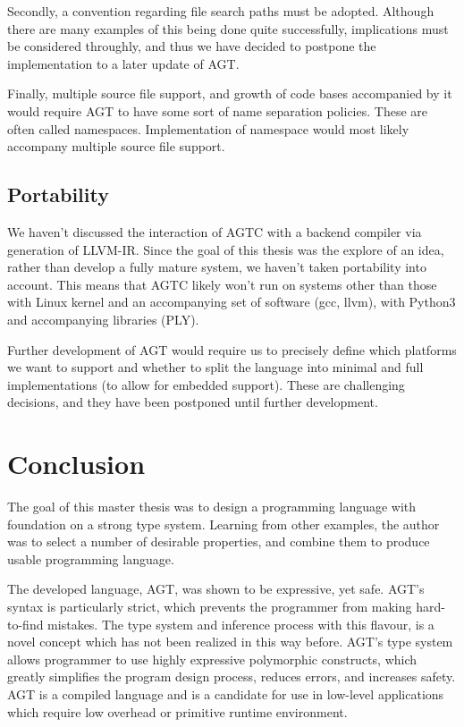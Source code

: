 \documentclass[times, utf8, diplomski]{fer}
\theoremstyle{definition}
\begin{document}
Secondly, a convention regarding file search paths must be adopted. Although there are many
examples of this being done quite successfully, implications must be considered throughly,
and thus we have decided to postpone the implementation to a later update of AGT.

Finally, multiple source file support, and growth of code bases accompanied by it would require
AGT to have some sort of name separation policies. These are often called namespaces.
Implementation of namespace would most likely accompany multiple source file support.

\section{Portability}

We haven't discussed the interaction of AGTC with a backend compiler via generation of LLVM-IR.
Since the goal of this thesis was the explore of an idea, rather than develop a fully mature system,
we haven't taken portability into account. This means that AGTC likely won't run on systems
other than those with Linux kernel and an accompanying set of software (gcc, llvm),
with Python3 and accompanying libraries (PLY).

Further development of AGT would require us to precisely define which platforms we want to support and
whether to split the language into minimal and full implementations (to allow for embedded support).
These are challenging decisions, and they have been postponed until further development.

\chapter{Conclusion}\label{chap:concl}

The goal of this master thesis was to design a programming language with foundation
on a strong type system. Learning from other examples, the author was to select a number
of desirable properties, and combine them to produce usable programming language.

The developed language, AGT, was shown to be expressive, yet safe. 
AGT's syntax is particularly strict, which prevents the programmer from making hard-to-find mistakes.
The type system and inference process with this flavour, is a novel concept which 
has not been realized in this way before. AGT's type system allows programmer to use
highly expressive polymorphic constructs, which greatly simplifies the program design process,
reduces errors, and increases safety. AGT is a compiled language and is a candidate
for use in low-level applications which require low overhead or primitive runtime environment.
\end{document}

